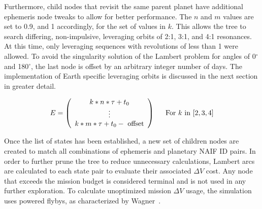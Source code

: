 \documentclass[letterpaper, preprint, paper,11pt]{AAS}	%
\begin{document}
Furthermore, child nodes that revisit the same parent planet have additional ephemeris node tweaks to allow for better performance. The $n$ and $m$ values are set to 0.9, and 1 accordingly, for the set of values in $k$. This allows the tree to search differing, non-impulsive, leveraging orbits of 2:1, 3:1, and 4:1 resonances. At this time, only leveraging sequences with revolutions of less than 1 were allowed. To avoid the singularity solution of the Lambert problem for angles of 0$^\circ$ and 180$^\circ$, the last node is offset by an arbitrary integer number of days. The implementation of Earth specific leveraging orbits is discussed in the next section in greater detail.

\begin{equation*}
    \label{eq:ephemArrayLev}
    E =
    \left(\begin{array}{c}
        k*n*\tau + t_0 \\
        \vdots \\
        k*m*\tau + t_0 - \text{ offset} \\
    \end{array}\right)\hspace{1.5em}
    \text{For } k \text{ in } [2, 3, 4]
\end{equation*}

Once the list of states has been established, a new set of children nodes are created to match all combinations of ephemeris and planetary NAIF ID pairs. In order to further prune the tree to reduce unnecessary calculations, Lambert arcs are calculated to each state pair to evaluate their associated $\Delta V$ cost. Any node that exceeds the mission budget is considered terminal and is not used in any further exploration. To calculate unoptimized mission $\Delta V$ usage, the simulation uses powered flybys, as characterized by Wagner~\cite{Wagner2015}.
\end{document}
